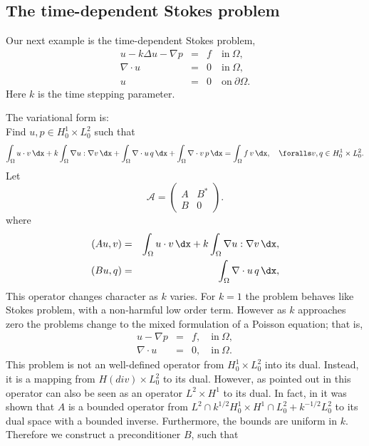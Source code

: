 \subsection{The time-dependent Stokes problem}
Our next example is the time-dependent Stokes problem,
\begin{eqnarray}
u - k \Delta u - \nabla p &=& f \quad \mbox{in} \ \Omega, \\
\nabla \cdot u &=& 0 \quad \mbox{in} \  \Omega, \\
             u &=& 0   \quad \mbox{on} \  \partial \Omega.
\end{eqnarray}
Here $k$ is the time stepping parameter.

The variational form is: \\
Find $u,p \in H^1_0 \times L_0^2$ such that
\[
\int_\Omega u \cdot v \,  \dx +
k \int_\Omega \nabla u : \nabla v \,  \dx +
\int_\Omega \nabla \cdot u \, q \,  \dx +
\int_\Omega \nabla \cdot v \, p \,  \dx = \int_\Omega f\, v\, \dx   , \quad
\foralls v,q \in H^1_0 \times L_0^2.
\]
Let
\[
\mathcal{A}  =
\begin{pmatrix} A & B^* \\ B & 0 \end{pmatrix}.
\]
where
\begin{eqnarray}
(A u, v) &=& \int_\Omega u \cdot v \,  \dx +  k \int_\Omega \nabla u :
\nabla v \,  \dx, \\
(B u, q) &=& \int_\Omega \nabla \cdot u \, q \,  \dx,
\end{eqnarray}
This operator changes character as $k$ varies.  For $k=1$ the problem
behaves like Stokes problem, with a non-harmful low order
term. However as $k$ approaches zero the problems change to the mixed
formulation of a Poisson equation; that is,
\begin{eqnarray}
u - \nabla p &=& f, \quad \mbox{in} \ \Omega, \\
\nabla \cdot u  &=& 0, \quad \mbox{in} \ \Omega.
\end{eqnarray}
This problem is not an well-defined operator from $H^1_0 \times L_0^2$
into its dual. Instead, it is a mapping from $H(div) \times L_0^2$ to
its dual.  However, as pointed out in \citet{MardalWinther2004} this
operator can also be seen as an operator $L^2 \times H^1$ to its dual.
In fact, in \citet{MardalTaiWinther2002a,MardalWinther2004} it was
shown that $A$ is a bounded operator from $L^2 \cap k^{1/2}
H^1_0 \times H^1 \cap L_0^2 + k^{-1/2} L_0^2$ to its dual space with a
bounded inverse. Furthermore, the bounds are uniform in $k$.
Therefore we construct a preconditioner $B$, such that

